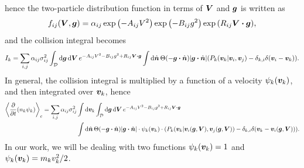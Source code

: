 \documentclass[aps,prl,preprint,groupedaddress,10pt]{revtex4-2}
\begin{document}
hence the two-particle distribution function in terms of $\vb*{V}$ and $\vb*{g}$ is written as
\begin{equation}
    f_{ij}\pqty{\bV,\bg}=\alpha_{ij}\exp\pqty{-A_{ij}V^2}\exp\pqty{-B_{ij}g^2}\exp\pqty{R_{ij}\bV\vdot\bg},
\end{equation}
and the collision integral becomes
\begin{equation}
    I_k = \sum_{i,j}\alpha_{ij}\sigma_{ij}^2\int_{\mathcal{D}}\dd{\bg}\dd{\bV}
    e^{-A_{ij}V^2-B_{ij}g^2+R_{ij}\bV\vdot\bg}
    \int\dd{\bn}\Theta\pqty{-\bg\vdot\bn}\abs{\bg\vdot\bn}
    \pqty{P_k(\bv_k\vert\bv_i,\bv_j)-\delta_{k,i}\delta\pqty{\bv_i-\bv_k}}.
\end{equation}
In general, the collision integral is multiplied by a function of a velocity $\psi_k(\vb*{v}_k)$,
and then integrated over $\vb*{v}_k$, hence
\begin{equation}
    \begin{split}
        \avg{\pdv{t}(n_k\psi_k)}_c=\sum_{i,j}\alpha_{ij}\sigma_{ij}^2&\int\dd{\bv_k}\int_{\mathcal{D}}
        \dd{\bg}\dd{\bV}e^{-A_{ij}V^2-B_{ij}g^2+R_{ij}\bV\vdot\bg}\\
        &\int\dd{\bn}\Theta\pqty{-\bg\vdot\bn}\abs{\bg\vdot\bn}\cdot\psi_k(\bv_k)\cdot
        \pqty{P_k(\bv_k\vert\bv_i(\bg,\bV),\bv_j(\bg,\bV))-\delta_{k,i}\delta\pqty{\bv_k-\bv_i(\bg,\bV)}}.
    \end{split}
\end{equation}
In our work, we will be dealing with two functions $\psi_k(\vb*{v}_k)=1$ and $\psi_k(\vb*{v}_k)=m_kv_k^2/2$.
\end{document}

